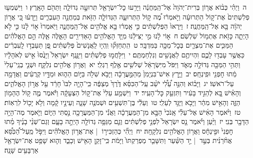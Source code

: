 \documentclass[18pt]{article}
\newcommand{\vart}[1]{\Bfootnote{#1}}	%
\newcommand{\kri}[1]{\Afootnote{#1}}	%
\begin{document}
 {\loc ה~}וַיְהִ֗י כְּב֨וֹא אֲר֤וֹן בְּרִית־יְהֹוָה֙ אֶל־הַֽמַּחֲנֶ֔ה וַיָּרִ֥עוּ כׇל־יִשְׂרָאֵ֖ל תְּרוּעָ֣ה גְדוֹלָ֑ה וַתֵּהֹ֖ם הָאָֽרֶץ׃ \startlock
 {\loc ו~}וַיִּשְׁמְע֤וּ פְלִשְׁתִּים֙ אֶת־ק֣וֹל הַתְּרוּעָ֔ה וַיֹּ֣אמְר֔וּ מֶ֠ה ק֣וֹל הַתְּרוּעָ֧ה הַגְּדוֹלָ֛ה הַזֹּ֖את בְּמַחֲנֵ֣ה הָעִבְרִ֑ים וַיֵּ֣דְע֔וּ כִּ֚י אֲר֣וֹן יְהֹוָ֔ה בָּ֖א אֶל־הַֽמַּחֲנֶֽה׃ \startlock
 {\loc ז~}וַיִּֽרְאוּ֙ הַפְּלִשְׁתִּ֔ים כִּ֣י אָֽמְר֔וּ בָּ֥א אֱלֹהִ֖ים אֶל־הַֽמַּחֲנֶ֑ה וַיֹּֽאמְרוּ֙ א֣וֹי לָ֔נוּ כִּ֣י לֹ֥א הָיְתָ֛ה כָּזֹ֖את אֶתְמ֥וֹל שִׁלְשֹֽׁם׃ \startlock
 {\loc ח~}א֣וֹי לָ֔נוּ מִ֣י יַצִּילֵ֔נוּ מִיַּ֛ד הָאֱלֹהִ֥ים הָאַדִּירִ֖ים הָאֵ֑לֶּה אֵ֧לֶּה הֵ֣ם הָאֱלֹהִ֗ים הַמַּכִּ֧ים אֶת־מִצְרַ֛יִם בְּכׇל־מַכָּ֖ה בַּמִּדְבָּֽר׃ \startlock
 {\loc ט~}הִֽתְחַזְּק֞וּ וִֽהְי֤וּ לַֽאֲנָשִׁים֙ פְּלִשְׁתִּ֔ים פֶּ֚ן תַּעַבְד֣וּ לָֽעִבְרִ֔ים כַּאֲשֶׁ֥ר עָבְד֖וּ לָכֶ֑ם וִהְיִיתֶ֥ם לַאֲנָשִׁ֖ים וְנִלְחַמְתֶּֽם׃ \startlock
 {\loc י~}וַיִּלָּחֲמ֣וּ פְלִשְׁתִּ֗ים וַיִּנָּ֤גֶף יִשְׂרָאֵל֙ וַיָּנֻ֙סוּ֙ אִ֣ישׁ לְאֹהָלָ֔יו וַתְּהִ֥י הַמַּכָּ֖ה גְּדוֹלָ֣ה מְאֹ֑ד וַיִּפֹּל֙ מִיִּשְׂרָאֵ֔ל שְׁלֹשִׁ֥ים אֶ֖לֶף רַגְלִֽי׃ \startlock
 {\loc יא~}וַאֲר֥וֹן אֱלֹהִ֖ים נִלְקָ֑ח וּשְׁנֵ֤י בְנֵֽי־עֵלִי֙ מֵ֔תוּ חׇפְנִ֖י וּפִֽינְחָֽס׃ \startlock
 {\loc יב~}וַיָּ֤רׇץ אִישׁ־בִּנְיָמִן֙ מֵהַמַּ֣עֲרָכָ֔ה וַיָּבֹ֥א שִׁלֹ֖ה בַּיּ֣וֹם הַה֑וּא וּמַדָּ֣יו קְרֻעִ֔ים וַאֲדָמָ֖ה עַל־רֹאשֽׁוֹ׃ \startlock
 {\loc יג~}וַיָּב֗וֹא וְהִנֵּ֣ה עֵ֠לִ֠י יֹשֵׁ֨ב עַֽל־הַכִּסֵּ֜א  \edtext{(יך)}{\kri{קרי: יַ֥ד}}  דֶּ֙רֶךְ֙ מְצַפֶּ֔ה כִּֽי־הָיָ֤ה לִבּוֹ֙ חָרֵ֔ד עַ֖ל אֲר֣וֹן הָאֱלֹהִ֑ים וְהָאִ֗ישׁ בָּ֚א לְהַגִּ֣יד בָּעִ֔יר וַתִּזְעַ֖ק כׇּל־הָעִֽיר׃ \startlock
 {\loc יד~}וַיִּשְׁמַ֤ע עֵלִי֙ אֶת־ק֣וֹל הַצְּעָקָ֔ה וַיֹּ֕אמֶר מֶ֛ה ק֥וֹל הֶהָמ֖וֹן הַזֶּ֑ה וְהָאִ֣ישׁ מִהַ֔ר וַיָּבֹ֖א וַיַּגֵּ֥ד לְעֵלִֽי׃ \startlock
 {\loc טו~}וְעֵלִ֕י בֶּן־תִּשְׁעִ֥ים וּשְׁמֹנֶ֖ה שָׁנָ֑ה וְעֵינָ֣יו קָ֔מָה וְלֹ֥א יָכ֖וֹל לִרְאֽוֹת׃ \startlock
 {\loc טז~}וַיֹּ֨אמֶר הָאִ֜ישׁ אֶל־עֵלִ֗י אָֽנֹכִי֙ הַבָּ֣א מִן־הַמַּעֲרָכָ֔ה וַאֲנִ֕י מִן־הַמַּעֲרָכָ֖ה נַ֣סְתִּי הַיּ֑וֹם וַיֹּ֛אמֶר מֶה־הָיָ֥ה הַדָּבָ֖ר בְּנִֽי׃ \startlock
 {\loc יז~}וַיַּ֨עַן  \edtext{הַֽמְבַשֵּׂ֜ר}{\vart{א=הַֽמֲבַשֵּׂ֜ר | }}  וַיֹּ֗אמֶר נָ֤ס יִשְׂרָאֵל֙ לִפְנֵ֣י פְלִשְׁתִּ֔ים וְגַ֛ם מַגֵּפָ֥ה גְדוֹלָ֖ה הָיְתָ֣ה בָעָ֑ם וְגַם־שְׁנֵ֨י בָנֶ֜יךָ מֵ֗תוּ חׇפְנִי֙ וּפִ֣ינְחָ֔ס וַאֲר֥וֹן הָאֱלֹהִ֖ים נִלְקָֽחָה׃ \startlock
 {\loc יח~}וַיְהִ֞י כְּהַזְכִּיר֣וֹ  |  אֶת־אֲר֣וֹן הָאֱלֹהִ֗ים וַיִּפֹּ֣ל מֵֽעַל־הַ֠כִּסֵּ֠א אֲחֹ֨רַנִּ֜ית בְּעַ֣ד  |  יַ֣ד הַשַּׁ֗עַר וַתִּשָּׁבֵ֤ר מַפְרַקְתּוֹ֙ וַיָּמֹ֔ת כִּֽי־זָקֵ֥ן הָאִ֖ישׁ וְכָבֵ֑ד וְה֛וּא שָׁפַ֥ט אֶת־יִשְׂרָאֵ֖ל אַרְבָּעִ֥ים שָׁנָֽה׃ \startlock
\end{document}
